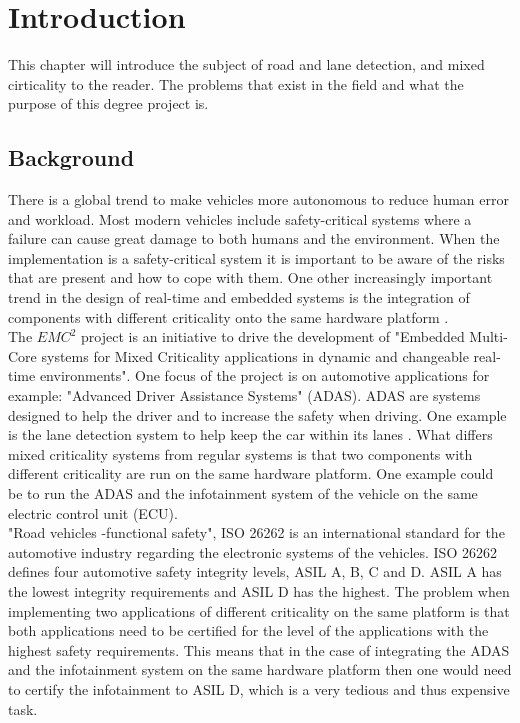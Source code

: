 \chapter{Introduction}
\label{sec:introduction}
This chapter will introduce the subject of road and lane detection, and mixed cirticality to the reader. The problems that exist in the field and what the purpose of this degree project is.


\section{Background}
There is a global trend to make vehicles more autonomous to reduce human error and workload. Most modern vehicles include safety-critical systems where a failure can cause great damage to both humans and the environment. When the implementation is a safety-critical system it is important to be aware of the risks that are present and how to cope with them. One other increasingly important trend in the design of real-time and embedded systems is the integration of components with different criticality onto the same hardware platform \cite{burns2013mixed}.\\

The $EMC^2$ project \cite{eu} is an initiative to drive the development of "Embedded Multi-Core systems for Mixed Criticality applications in dynamic and changeable real-time environments". One focus of the project is on automotive applications for example: "Advanced Driver Assistance Systems" (ADAS). ADAS are systems designed to help the driver and to increase the safety when driving. One example is the lane detection system to help keep the car within its lanes \cite{BarHillel2014}. What differs mixed criticality systems from regular systems is that two components with different criticality are run on the same hardware platform. One example could be to run the ADAS and the infotainment system of the vehicle on the same electric control unit (ECU).\\

"Road vehicles -functional safety", ISO 26262 is an international standard for the automotive industry regarding the electronic systems of the vehicles. ISO 26262 defines four automotive safety integrity levels, ASIL A, B, C and D. ASIL A has the lowest integrity requirements and ASIL D has the highest. The problem when implementing two applications of different criticality on the same platform is that both applications need to be certified for the level of the applications with the highest safety requirements. This means that in the case of integrating the ADAS and the infotainment system on the same hardware platform then one would need to certify the infotainment to ASIL D, which is a very tedious and thus expensive task.\\

